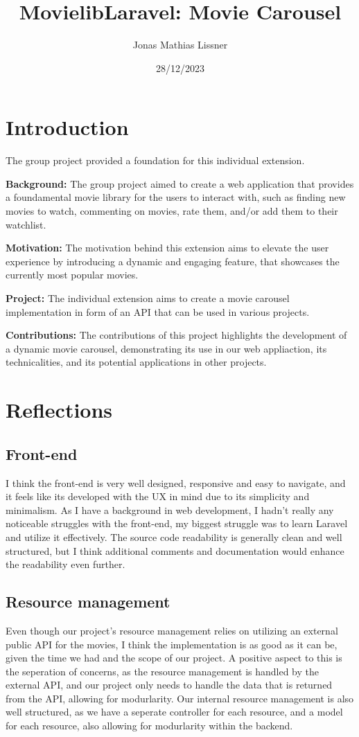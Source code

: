 \documentclass[letterpaper,twocolumn]{article}
\title{MovielibLaravel: Movie Carousel}
\author{Jonas Mathias Lissner}
\date{28/12/2023}
\begin{document}
\maketitle
\clearpage
\section{Introduction}
The group project provided a foundation for this individual extension.

\textbf{Background:} %
The group project aimed to create a web application that provides a foundamental movie library for the users to interact with, such as finding new movies to watch, 
commenting on movies, rate them, and/or add them to their watchlist.

\textbf{Motivation:} %
The motivation behind this extension aims to elevate the user experience by introducing a dynamic and engaging feature, that showcases the currently most popular movies.

\textbf{Project:} %
The individual extension aims to create a movie carousel implementation in form of an API that can be used in various projects.

\textbf{Contributions:} %
The contributions of this project highlights the development of a dynamic movie carousel, demonstrating its use in our web appliaction, its technicalities, and its potential applications in other projects.


\section{Reflections}
\subsection{Front-end} %
I think the front-end is very well designed, responsive and easy to navigate, and it feels like its developed with the UX in mind due to its simplicity and minimalism.
As I have a background in web development, I hadn't really any noticeable struggles with the front-end, my biggest struggle was to learn Laravel and utilize it effectively.
The source code readability is generally clean and well structured, but I think additional comments and documentation would enhance the readability even further.

\subsection{Resource management}  %
Even though our project's resource management relies on utilizing an external public API for the movies, I think the implementation is as good as it can be, given the time we had and the scope of our project. 
A positive aspect to this is the seperation of concerns, as the resource management is handled by the external API, and our project only needs to handle the data that is returned from the API, allowing for modurlarity.
Our internal resource management is also well structured, as we have a seperate controller for each resource, and a model for each resource, also allowing for modurlarity within the backend.
\end{document}
